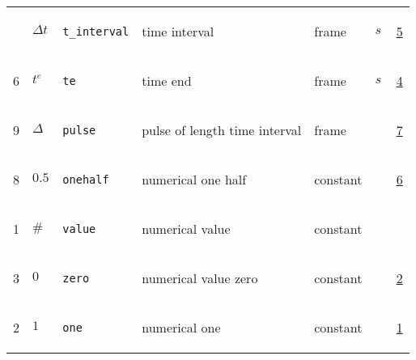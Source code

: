 \begin{longtable}{|p{1cm}|p{2.5cm}|p{4.5cm}|p{8cm}|p{3.0cm}|p{3cm}|p{1cm}|}
             & \hypertarget{"v:7"}{ $ {{\Delta t}}{_{}} $}
             & \verb|t_interval|
             & time interval
             & \begin{lay}frame \end{lay}
             & $ s \, $
             &                 \hyperlink{"e:5"}{ 5 }
                 \\
            6
             & \hypertarget{"v:6"}{ $ {{t^e}}{_{}} $}
             & \verb|te|
             & time end
             & \begin{lay}frame \end{lay}
             & $ s \, $
             &                 \hyperlink{"e:4"}{ 4 }
                 \\
            9
             & \hypertarget{"v:9"}{ $ {{\Delta}}{_{}} $}
             & \verb|pulse|
             & pulse of length time interval
             & \begin{lay}frame \end{lay}
             & $  $
             &                 \hyperlink{"e:7"}{ 7 }
                 \\
            8
             & \hypertarget{"v:8"}{ $ {0.5}{_{}} $}
             & \verb|onehalf|
             & numerical one half
             & \begin{lay}constant \end{lay}
             & $  $
             &                 \hyperlink{"e:6"}{ 6 }
                 \\
            1
             & \hypertarget{"v:1"}{ $ {{\#}}{_{}} $}
             & \verb|value|
             & numerical value
             & \begin{lay}constant \end{lay}
             & $  $
             & \\
            3
             & \hypertarget{"v:3"}{ $ {0}{_{}} $}
             & \verb|zero|
             & numerical value zero
             & \begin{lay}constant \end{lay}
             & $  $
             &                 \hyperlink{"e:2"}{ 2 }
                 \\
            2
             & \hypertarget{"v:2"}{ $ {1}{_{}} $}
             & \verb|one|
             & numerical one
             & \begin{lay}constant \end{lay}
             & $  $
             &                 \hyperlink{"e:1"}{ 1 }
                 \\
    \end{longtable}